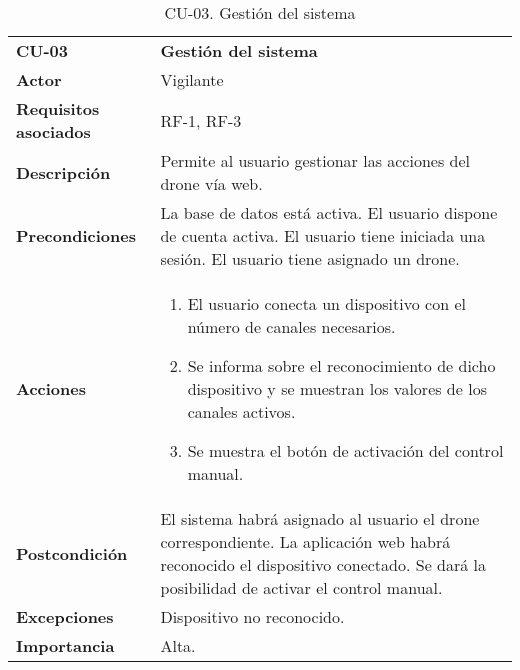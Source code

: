 \begin{table}[H]
	\begin{center}
		\begin{tabular}{m{3cm} | m{10cm}}\hline
			\toprule
			\textbf{CU-03} & \textbf{Gestión del sistema}\\
			\otoprule
			\textbf{Actor} & Vigilante\\
			\textbf{Requisitos asociados} & RF-1, RF-3\\
			\textbf{Descripción} & Permite al usuario gestionar las acciones del drone vía web.\\
			\textbf{Precondiciones} & La base de datos está activa. El usuario dispone de cuenta activa. El usuario tiene iniciada una sesión. El usuario tiene asignado un drone.\\
			\textbf{Acciones} & \begin{enumerate}
											\item El usuario conecta un dispositivo con el número de canales necesarios. 
											\item Se informa sobre el reconocimiento de dicho dispositivo y se muestran los valores de los canales activos.
											\item Se muestra el botón de activación del control manual.
											\end{enumerate}\\
			
			\textbf{Postcondición} & El sistema habrá asignado al usuario el drone correspondiente. La aplicación web habrá reconocido el dispositivo conectado. Se dará la posibilidad de activar el control manual.\\
			\textbf{Excepciones} & Dispositivo no reconocido.\\
			\textbf{Importancia} & Alta.\\
			\hline
			\bottomrule
		\end{tabular}
		\caption{CU-03. Gestión del sistema}
		\label{tb:CU03}
	\end{center}
\end{table}


